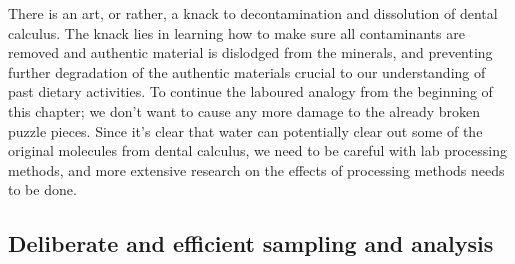 \documentclass[
  letterpaper,
]{book}
\begin{document}
There is an art, or rather, a knack to decontamination and dissolution
of dental calculus. The knack lies in learning how to make sure all
contaminants are removed and authentic material is dislodged from the
minerals, and preventing further degradation of the authentic materials
crucial to our understanding of past dietary activities. To continue the
laboured analogy from the beginning of this chapter; we don't want to
cause any more damage to the already broken puzzle pieces. Since it's
clear that water can potentially clear out some of the original
molecules from dental calculus, we need to be careful with lab
processing methods, and more extensive research on the effects of
processing methods needs to be done.

\hypertarget{deliberate-and-efficient-sampling-and-analysis}{%
\subsection{Deliberate and efficient sampling and
analysis}\label{deliberate-and-efficient-sampling-and-analysis}}
\end{document}
